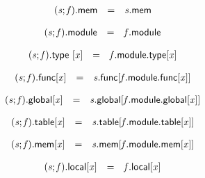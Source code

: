 $$
\begin{array}{@{}lcl@{}l@{}}
({\mathit{s}} ; {\mathit{f}}).\mathsf{mem} &=& {\mathit{s}}.\mathsf{mem} &  \\
\end{array}
$$

$$
\begin{array}{@{}lcl@{}l@{}}
({\mathit{s}} ; {\mathit{f}}).\mathsf{module} &=& {\mathit{f}}.\mathsf{module} &  \\
\end{array}
$$

$$
\begin{array}{@{}lcl@{}l@{}}
({\mathit{s}} ; {\mathit{f}}).\mathsf{type}~{}[{\mathit{x}}] &=& {\mathit{f}}.\mathsf{module}.\mathsf{type}{}[{\mathit{x}}] &  \\
\end{array}
$$

$$
\begin{array}{@{}lcl@{}l@{}}
{({\mathit{s}} ; {\mathit{f}}).\mathsf{func}}{{}[{\mathit{x}}]} &=& {\mathit{s}}.\mathsf{func}{}[{\mathit{f}}.\mathsf{module}.\mathsf{func}{}[{\mathit{x}}]] &  \\
\end{array}
$$

$$
\begin{array}{@{}lcl@{}l@{}}
{({\mathit{s}} ; {\mathit{f}}).\mathsf{global}}{{}[{\mathit{x}}]} &=& {\mathit{s}}.\mathsf{global}{}[{\mathit{f}}.\mathsf{module}.\mathsf{global}{}[{\mathit{x}}]] &  \\
\end{array}
$$

$$
\begin{array}{@{}lcl@{}l@{}}
{({\mathit{s}} ; {\mathit{f}}).\mathsf{table}}{{}[{\mathit{x}}]} &=& {\mathit{s}}.\mathsf{table}{}[{\mathit{f}}.\mathsf{module}.\mathsf{table}{}[{\mathit{x}}]] &  \\
\end{array}
$$

$$
\begin{array}{@{}lcl@{}l@{}}
{({\mathit{s}} ; {\mathit{f}}).\mathsf{mem}}{{}[{\mathit{x}}]} &=& {\mathit{s}}.\mathsf{mem}{}[{\mathit{f}}.\mathsf{module}.\mathsf{mem}{}[{\mathit{x}}]] &  \\
\end{array}
$$

$$
\begin{array}{@{}lcl@{}l@{}}
{({\mathit{s}} ; {\mathit{f}}).\mathsf{local}}{{}[{\mathit{x}}]} &=& {\mathit{f}}.\mathsf{local}{}[{\mathit{x}}] &  \\
\end{array}
$$

